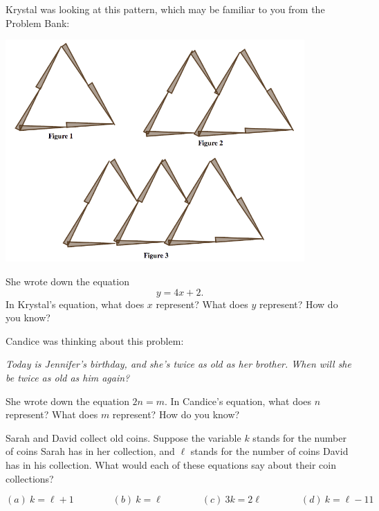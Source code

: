 \begin{problem}\label{prob: krystal}
Krystal was looking at this pattern, which may be familiar to you from the Problem Bank:
\begin{center}
\includegraphics[height=8.5cm]{toothpicks4}
\end{center}
She wrote down the equation
\[
y = 4x + 2.
\]
In Krystal's equation, what does $x$ represent?  What does $y$ represent?  How do you know?


\end{problem}

\bigskip


\begin{problem}
Candice was thinking about this problem:
\begin{center}
\emph{Today is Jennifer's birthday, and she's twice as old as her brother.  When will she be twice as old as him again?}
\end{center}
She wrote down the equation $2 n = m$.  In Candice's equation, what does $n$ represent?  What does $m$ represent?  How do you know?

\end{problem}

\bigskip

\begin{problem}
Sarah and David collect old coins.  Suppose the variable $k$ stands for the number of coins Sarah has in her collection, and $\ell$ stands for the number of coins David has in his collection.  What would each of these equations say about their coin collections?

\[
(a)\  k = \ell + 1 
\qquad\qquad
(b)\  k = \ell 
\qquad\qquad
(c) \ 3k = 2\ell
\qquad\qquad
(d)\  k = \ell - 11
\]


\end{problem}



